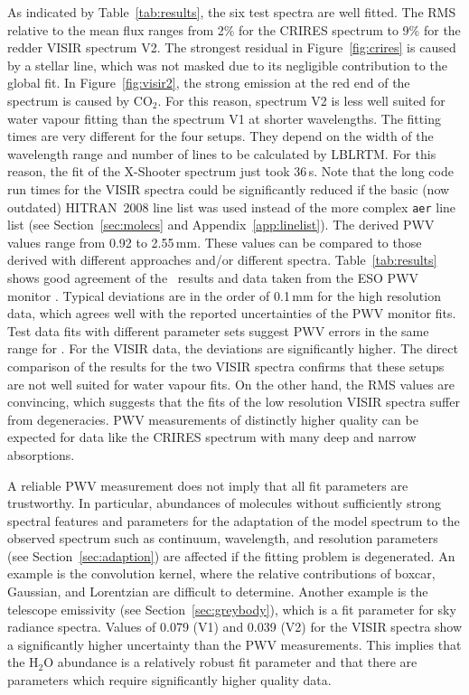 As indicated by Table~\ref{tab:results}, the six test spectra are well fitted.
The RMS relative to the mean flux ranges from 2\% for the CRIRES spectrum to
9\% for the redder VISIR spectrum V2. The strongest residual in
Figure~\ref{fig:crires} is caused by a stellar line, which was not masked due
to its negligible contribution to the global fit. In Figure~\ref{fig:visir2},
the strong emission at the red end of the spectrum is caused by CO$_2$. For
this reason, spectrum V2 is less well suited for water vapour fitting than the
spectrum V1 at shorter wavelengths. The fitting times are very different for
the four setups. They depend on the width of the wavelength range and number of
lines to be calculated by \ac{LBLRTM}. For this reason, the fit of the
X-Shooter spectrum just took 36\,s. Note that the long code run times for the
VISIR spectra could be significantly reduced if the basic (now outdated)
\ac{HITRAN}~2008 line list was used instead of the more complex {\tt aer} line
list (see Section~\ref{sec:molecs} and Appendix~\ref{app:linelist}). The
derived \ac{PWV} values range from 0.92 to 2.55\,mm. These values can be
compared to those derived with different approaches and/or different spectra.
Table~\ref{tab:results} shows good agreement of the \mf\ results and data taken
from the ESO \ac{PWV} monitor \cite{PWV}. Typical deviations are
in the order of 0.1\,mm for the high resolution data, which agrees well with
the reported uncertainties of the \ac{PWV} monitor fits. Test data fits with
different parameter sets suggest \ac{PWV} errors in the same range for \mf.
For the VISIR data, the deviations are significantly higher. The direct
comparison of the results for the two VISIR spectra confirms that these setups
are not well suited for water vapour fits. On the other hand, the RMS values
are convincing, which suggests that the fits of the low resolution VISIR
spectra suffer from degeneracies. \ac{PWV} measurements of distinctly higher
quality can be expected for data like the CRIRES spectrum with many deep and
narrow absorptions.

A reliable \ac{PWV} measurement does not imply that all fit parameters are
trustworthy. In particular, abundances of molecules without sufficiently strong
spectral features and parameters for the adaptation of the model spectrum
to the observed spectrum such as continuum, wavelength, and resolution
parameters (see Section~\ref{sec:adaption}) are affected if the fitting problem
is degenerated. An example is the convolution kernel, where the relative
contributions of boxcar, Gaussian, and Lorentzian are difficult to determine.
Another example is the telescope emissivity (see Section~\ref{sec:greybody}),
which is a fit parameter for sky radiance spectra. Values of 0.079 (V1) and
0.039 (V2) for the VISIR spectra show a significantly higher uncertainty than
the \ac{PWV} measurements. This implies that the H$_2$O abundance is a
relatively robust fit parameter and that there are parameters which require
significantly higher quality data.

